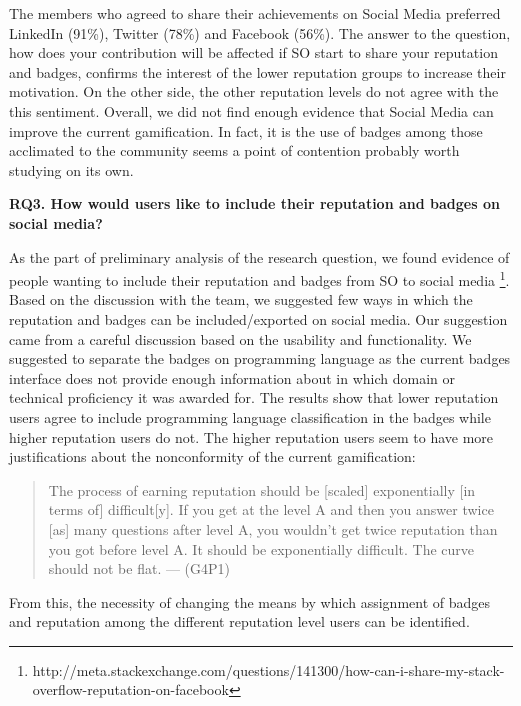 \documentclass{sigchi}
\begin{document}
The members who agreed to share their achievements on Social Media preferred LinkedIn (91\%), Twitter (78\%) and Facebook (56\%). The answer to the question, how does your contribution will be affected if SO start to share your reputation and badges, confirms the interest of the lower reputation groups to increase their motivation. On the other side, the other reputation levels do not agree with the this sentiment. Overall, we did not find enough evidence that Social Media can improve the current gamification. In fact, it is the use of badges among those acclimated to the community seems a point of contention probably worth studying on its own.

\textbf{RQ3. How would users like to include their reputation and badges on social media?}

As the part of preliminary analysis of the research question, we found evidence of people wanting to include their reputation and badges from SO to social media \footnote{http://meta.stackexchange.com/questions/141300/how-can-i-share-my-stack-overflow-reputation-on-facebook}. Based on the discussion with the team, we suggested few ways in which the reputation and badges can be included/exported on social media. Our suggestion came from a careful discussion based on the usability and functionality. We suggested to separate the badges on programming language as the current badges interface does not provide enough information about in which domain or technical proficiency it was awarded for. The results show that lower reputation users agree to include programming language classification in the badges while higher reputation users do not. The higher reputation users seem to have more justifications about the nonconformity of the current gamification:

\begin{quote}
The process of earning reputation should be [scaled] exponentially [in terms of] difficult[y]. If you get at the level A and then you answer twice [as] many questions after level A, you wouldn't get twice reputation than you got before level A. It should be exponentially difficult. The curve should not be flat. --- (G4P1)
\end{quote}

From this, the necessity of changing the means by which assignment of badges and reputation among the different reputation level users can be identified.
\end{document}

